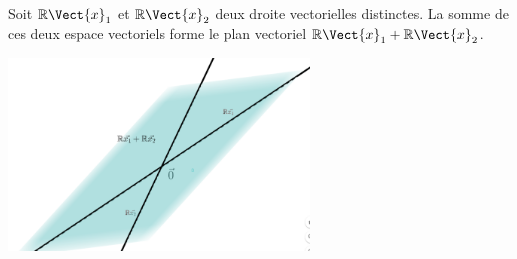 \documentclass{book}
\begin{document}
\begin{Exemple}
Soit $\R \Vect{x}_1$ et $\R \Vect{x}_2$ deux droite vectorielles distinctes. La somme de ces deux espace vectoriels forme le plan vectoriel $\R \Vect{x}_1+\R \Vect{x}_2$.
\begin{center}
\includegraphics[width=8cm]{espace_vectoriel_somme.png}
\end{center}
\end{Exemple}
\end{document}
